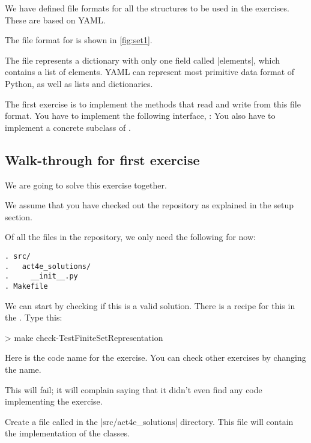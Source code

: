 We have defined file formats for all the structures to be used in the exercises.
These are based on YAML\@.


The file format for  is shown in \cref{fig:set1}.


The file represents a dictionary with only one field called \pystr|elements|, which contains a list of elements.
YAML can represent most primitive data format of Python, as well as lists and dictionaries.

\begin{gradedexercise}
  \label{ex:setrepr}
  The first exercise is to implement the methods that read and write from this file format.
  You have to implement the following interface, :
%
  You also have to implement a concrete subclass of .
\end{gradedexercise}

\subsection{Walk-through for first exercise}

We are going to solve this exercise together.

We assume that you have checked out the repository as explained in the setup section.

Of all the files in the repository, we only need the following for now:

\begin{verbatim}
. src/
.   act4e_solutions/
.     __init__.py
. Makefile
\end{verbatim}


We can start by checking if this is a valid solution. There is a recipe for this in the .
Type this:

\begin{console}
  > make check-TestFiniteSetRepresentation
\end{console}

Here  is the code name for the exercise. You can check other exercises by changing the name.

This will fail; it will complain saying that it didn't even find any code implementing the exercise.


Create a file called  in the \files|src/act4e_solutions| directory.
This file will contain the implementation of the classes.

